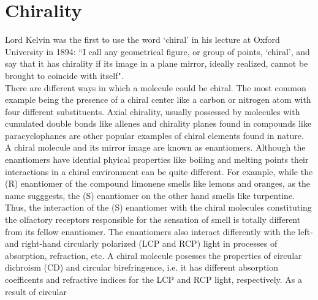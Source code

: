 
\section{Chirality}
Lord Kelvin was the first to use the word `chiral' in his lecture at Oxford 
University in 1894: ``I call any geometrical figure, or group of points, 
`chiral', and say that it has chirality if its image in a plane mirror, ideally realized, 
cannot be brought to coincide with itself"\cite{}. 
\\
There are different ways in which a molecule 
could be chiral. The most common example being the presence of a chiral center 
like a carbon or nitrogen atom with four different substituents. Axial chirality, usually 
possessed by molecules with cumulated double bonds like allenes and chirality planes 
found in compounds like paracyclophanes are other popular examples of chiral elements 
found in nature. \\
A chiral molecule and its mirror image are known as enantiomers. Although the
enantiomers have idential phyical properties like boiling and melting points their
interactions in a chiral environment can be quite different. For example,
while the (R) enantiomer of the compound limonene smells like lemons and oranges,
as the name sugggests, the (S) enantiomer on the other hand smells like turpentine. 
Thus, the interaction of the (S) enantiomer with the chiral molecules constituting the olfactory receptors 
responsible for the sensation of smell is totally different from its fellow enantiomer.
The enantiomers also interact differently with the left- and right-hand circularly polarized (LCP and
RCP) light in processes of absorption, refraction, etc. A chiral molecule posesses the 
properties of circular dichroism (CD) and circular birefringence, i.e. it has different absorption 
coefficents and refractive indices for the LCP and RCP light, respectively. As a result of circular 
